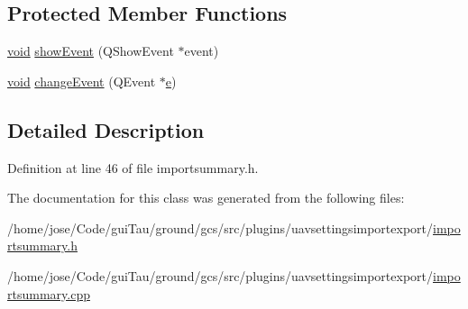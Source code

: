 \subsection*{Protected Member Functions}
\begin{DoxyCompactItemize}
\item 
\hyperlink{group___u_a_v_objects_plugin_ga444cf2ff3f0ecbe028adce838d373f5c}{void} \hyperlink{group___u_a_v_settings_import_export_gad8e0a82289892d886b2e350ea7dd1faf}{show\-Event} (Q\-Show\-Event $\ast$event)
\item 
\hyperlink{group___u_a_v_objects_plugin_ga444cf2ff3f0ecbe028adce838d373f5c}{void} \hyperlink{group___u_a_v_settings_import_export_ga31da7a0667d03f1e71cd5012bee5b544}{change\-Event} (Q\-Event $\ast$\hyperlink{_o_p_plots_8m_a9425be9aab51621e317ba7ade564b570}{e})
\end{DoxyCompactItemize}


\subsection{Detailed Description}


Definition at line 46 of file importsummary.\-h.



The documentation for this class was generated from the following files\-:\begin{DoxyCompactItemize}
\item 
/home/jose/\-Code/gui\-Tau/ground/gcs/src/plugins/uavsettingsimportexport/\hyperlink{importsummary_8h}{importsummary.\-h}\item 
/home/jose/\-Code/gui\-Tau/ground/gcs/src/plugins/uavsettingsimportexport/\hyperlink{importsummary_8cpp}{importsummary.\-cpp}\end{DoxyCompactItemize}
